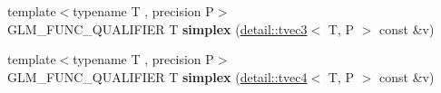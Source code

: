 \begin{DoxyCompactItemize}
\item 
\hypertarget{namespaceglm_aa95d7bc123a0a077dc7f015333e2d674}{{\footnotesize template$<$typename T , precision P$>$ }\\G\-L\-M\-\_\-\-F\-U\-N\-C\-\_\-\-Q\-U\-A\-L\-I\-F\-I\-E\-R T {\bfseries simplex} (\hyperlink{structglm_1_1detail_1_1tvec3}{detail\-::tvec3}$<$ T, P $>$ const \&v)}\label{namespaceglm_aa95d7bc123a0a077dc7f015333e2d674}

\item 
\hypertarget{namespaceglm_aadad60578e53c3af96e0a078cc4ad462}{{\footnotesize template$<$typename T , precision P$>$ }\\G\-L\-M\-\_\-\-F\-U\-N\-C\-\_\-\-Q\-U\-A\-L\-I\-F\-I\-E\-R T {\bfseries simplex} (\hyperlink{structglm_1_1detail_1_1tvec4}{detail\-::tvec4}$<$ T, P $>$ const \&v)}\label{namespaceglm_aadad60578e53c3af96e0a078cc4ad462}


\end{DoxyCompactItemize}
